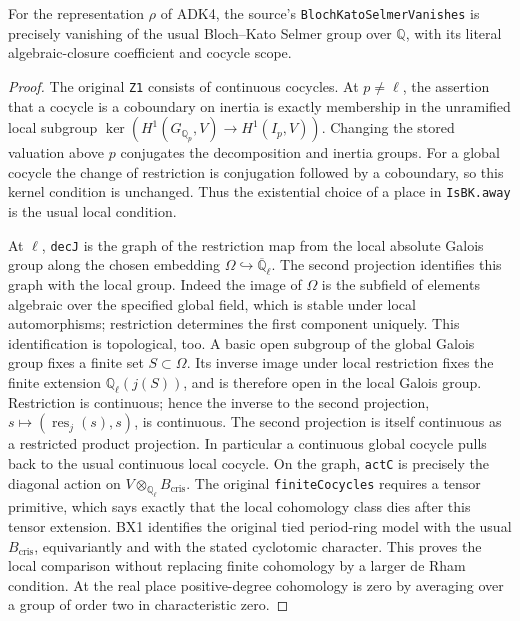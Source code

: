 \begin{lemma}
\label{claim:ADK5}
For the representation $\rho$ of ADK4, the source's
\texttt{BlochKatoSelmerVanishes} is precisely vanishing of the usual
Bloch--Kato Selmer group over $\mathbb Q$, with its literal
algebraic-closure coefficient and cocycle scope.
\end{lemma}
\begin{proof}
The original \texttt{Z1} consists of continuous cocycles.  At
$p\ne\ell$, the assertion that a cocycle is a coboundary on inertia
is exactly membership in the unramified local subgroup
$\ker(H^1(G_{\mathbb Q_p},V)\to H^1(I_p,V))$.
Changing the stored valuation above $p$ conjugates the decomposition
and inertia groups.  For a global cocycle the change of restriction
is conjugation followed by a coboundary, so this kernel condition is
unchanged.  Thus the existential choice of a place in
\texttt{IsBK.away} is the usual local condition.

At $\ell$, \texttt{decJ} is the graph of the restriction map from
the local absolute Galois group along the chosen embedding
$\Omega\hookrightarrow\overline{\mathbb Q}_\ell$.  The second
projection identifies this graph with the local group.  Indeed the
image of $\Omega$ is the subfield of elements algebraic over the
specified global field, which is stable under local automorphisms;
restriction determines the first component uniquely.  This
identification is topological, too.  A basic open subgroup of the
global Galois group fixes a finite set $S\subset\Omega$.
Its inverse image under local restriction fixes the finite extension
$\mathbb Q_\ell(j(S))$, and is therefore open in the local Galois
group.  Restriction is continuous; hence the inverse to the second
projection, $s\mapsto(\operatorname{res}_j(s),s)$, is continuous.
The second projection is itself continuous as a restricted product
projection.  In particular a continuous global cocycle pulls back
to the usual continuous local cocycle.  On the graph,
\texttt{actC} is precisely the diagonal action on
$V\otimes_{\mathbb Q_\ell}B_{\mathrm{cris}}$.
The original \texttt{finiteCocycles} requires a tensor primitive,
which says exactly that the local cohomology class dies after this
tensor extension.  BX1 identifies the original tied period-ring
model with the usual $B_{\mathrm{cris}}$, equivariantly and with
the stated cyclotomic character.  This proves the local comparison
without replacing finite cohomology by a larger de Rham condition.
At the real place positive-degree cohomology is zero by averaging
over a group of order two in characteristic zero.


\end{proof}
